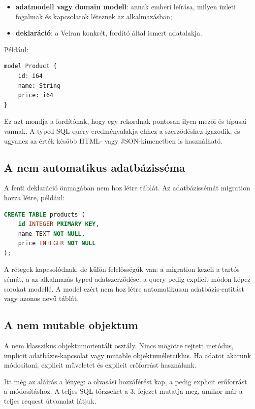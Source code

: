 \begin{itemize}
  \item \textbf{adatmodell vagy domain modell}: annak emberi leírása, milyen üzleti fogalmak és kapcsolatok léteznek az alkalmazásban;
  \item \textbf{ deklaráció}: a Velran konkrét, fordító által ismert adatalakja.
\end{itemize}

Például:

\begin{lstlisting}[language=Velran]
model Product {
    id: i64
    name: String
    price: i64
}
\end{lstlisting}

Ez azt mondja a fordítónak, hogy egy  rekordnak pontosan ilyen mezői és típusai vannak. A typed SQL query eredményalakja ehhez a szerződéshez igazodik, és ugyanez az érték később HTML- vagy JSON-kimenetben is használható.

\subsection*{A  nem automatikus adatbázisséma}

A fenti deklaráció önmagában nem hoz létre  táblát. Az adatbázissémát migration hozza létre, például:

\begin{lstlisting}[language=SQL]
CREATE TABLE products (
    id INTEGER PRIMARY KEY,
    name TEXT NOT NULL,
    price INTEGER NOT NULL
);
\end{lstlisting}

A rétegek kapcsolódnak, de külön felelősségük van: a migration kezeli a tartós sémát, a  az alkalmazás typed adatszerződése, a query pedig explicit módon képez sorokat modellé. A model ezért nem hoz létre automatikusan adatbázis-entitást vagy azonos nevű táblát.

\subsection*{A  nem mutable objektum}

A  nem klasszikus objektumorientált osztály. Nincs mögötte rejtett  metódus, implicit adatbázis-kapcsolat vagy mutable objektuméletciklus. Ha adatot akarunk módosítani, explicit műveletet és explicit erőforrást használunk.

Itt még az aláírás a lényeg: a   olvasási hozzáférést kap, a  pedig explicit  erőforrást a módosításhoz. A teljes SQL-törzseket a 3. fejezet mutatja meg, amikor már a teljes request útvonalat látjuk.


